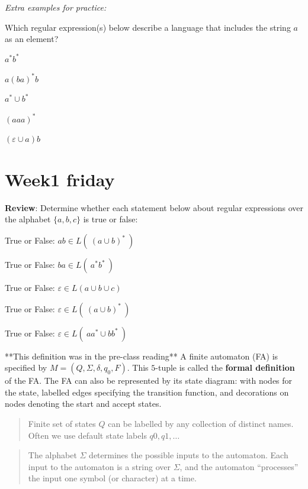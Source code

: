 \documentclass[12pt, oneside]{article}
\begin{document}
\vfill


{\it Extra examples for practice:}

Which regular expression(s) below describe a language that includes the string $a$ as an element?

$a^* b^*$ 

\vfill

$a(ba)^* b$

\vfill

$a^* \cup b^*$

\vfill

$(aaa)^*$

\vfill

$(\varepsilon \cup a) b$

\vfill \vfill
\section*{Week1 friday}


{\bf Review}: Determine whether each statement below about regular expressions
over the alphabet $\{a,b,c\}$ is true or false:

True or False: \qquad 
   $ab  \in L(~ (a \cup b)^*  ~)$
   
True or False: \qquad    
   $ba \in L( ~ a^* b^* ~)$
   
True or False: \qquad 
   $\varepsilon  \in L(a \cup b \cup c)$
   
True or False: \qquad 
   $\varepsilon  \in L(~ (a \cup b)^*  ~)$

True or False: \qquad 
   $\varepsilon \in L( ~ aa^* \cup bb^* ~)$


**This definition was in the pre-class reading**
A finite automaton (FA) is specified by  $M = (Q, \Sigma, \delta, q_0, F)$.
This $5$-tuple is called the {\bf formal definition} of the FA. The FA can also 
be represented by its state diagram: with nodes for the state, labelled edges specifying the 
transition function, and decorations on nodes denoting the start and accept states.

\begin{quote}
Finite set of states $Q$ can be labelled by any collection of distinct names. Often
we use default state labels $q0, q1, \ldots$ 
\end{quote}

\begin{quote}  
The alphabet $\Sigma$ determines the possible inputs to the automaton. 
Each input to the automaton is a string over  $\Sigma$, and the automaton ``processes'' the input
one symbol (or character) at a time.
\end{quote}
\end{document}
